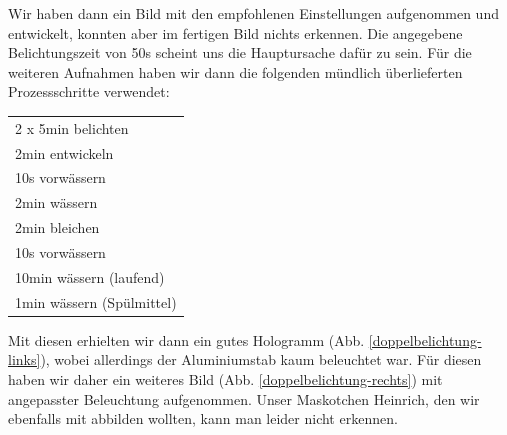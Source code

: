 Wir haben dann ein Bild mit den empfohlenen Einstellungen aufgenommen und entwickelt, konnten aber im fertigen Bild nichts erkennen. Die angegebene Belichtungszeit von 50s scheint uns die Hauptursache dafür zu sein. Für die weiteren Aufnahmen haben wir dann die folgenden mündlich überlieferten Prozessschritte \cite{lena_christian} verwendet:

\begin{tabular}{l}
 2 x 5min belichten\\
 2min entwickeln\\
 10s vorwässern\\
 2min wässern\\
 2min bleichen\\
 10s vorwässern\\
 10min wässern (laufend)\\
 1min wässern (Spülmittel) 
\end{tabular}

Mit diesen erhielten wir dann ein gutes Hologramm (Abb. \ref{doppelbelichtung-links}), wobei allerdings der Aluminiumstab kaum beleuchtet war. Für diesen haben wir daher ein weiteres Bild (Abb. \ref{doppelbelichtung-rechts}) mit angepasster Beleuchtung aufgenommen. Unser Maskotchen Heinrich, den wir ebenfalls mit abbilden wollten, kann man leider nicht erkennen. 

